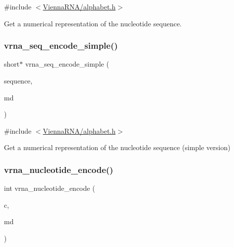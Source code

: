 {\ttfamily \#include $<$\mbox{\hyperlink{alphabet_8h}{Vienna\+R\+N\+A/alphabet.\+h}}$>$}



Get a numerical representation of the nucleotide sequence. 

\mbox{\label{group__utils_ga3cd79d21d53248ad2634c1c0d43e97d7}} 
\subsubsection{\texorpdfstring{vrna\+\_\+seq\+\_\+encode\+\_\+simple()}{vrna\_seq\_encode\_simple()}}
{\footnotesize\ttfamily short$\ast$ vrna\+\_\+seq\+\_\+encode\+\_\+simple (\begin{DoxyParamCaption}\item[{const char $\ast$}]{sequence,  }\item[{\mbox{\hyperlink{group__model__details_ga1f8a10e12a0a1915f2a4eff0b28ea17c}{vrna\+\_\+md\+\_\+t}} $\ast$}]{md }\end{DoxyParamCaption})}



{\ttfamily \#include $<$\mbox{\hyperlink{alphabet_8h}{Vienna\+R\+N\+A/alphabet.\+h}}$>$}



Get a numerical representation of the nucleotide sequence (simple version) 

\mbox{\label{group__utils_gac12bf00123f88621c9be847b0879c1fb}} 
\subsubsection{\texorpdfstring{vrna\+\_\+nucleotide\+\_\+encode()}{vrna\_nucleotide\_encode()}}
{\footnotesize\ttfamily int vrna\+\_\+nucleotide\+\_\+encode (\begin{DoxyParamCaption}\item[{char}]{c,  }\item[{\mbox{\hyperlink{group__model__details_ga1f8a10e12a0a1915f2a4eff0b28ea17c}{vrna\+\_\+md\+\_\+t}} $\ast$}]{md }\end{DoxyParamCaption})}



